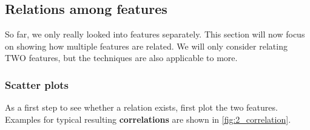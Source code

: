\subsection{Relations among features}
So far, we only really looked into features separately. This section will now focus on showing how multiple features are related. We will only consider relating TWO features, but the techniques are also applicable to more.

\subsubsection*{Scatter plots}

As a first step to see whether a relation exists, first plot the two features. Examples for typical resulting \textbf{correlations} are shown in \ref{fig:2_correlation}.

